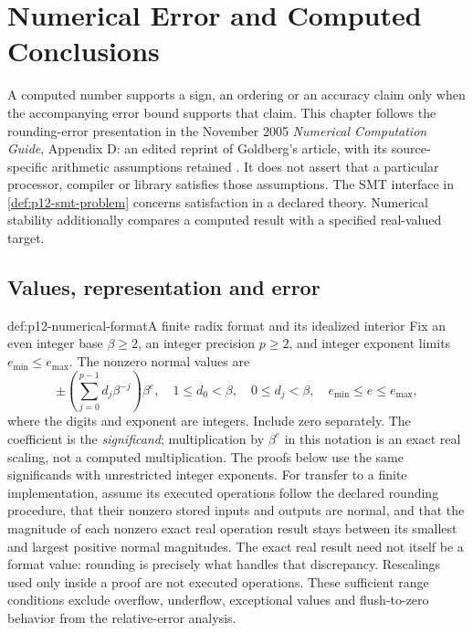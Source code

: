 \chapter{Numerical Error and Computed Conclusions}
\label{sec:p12-numerical-error-and-inference}

A computed number supports a sign, an ordering or an accuracy claim only
when the accompanying error bound supports that claim. This chapter follows
the rounding-error presentation in the November 2005 \emph{Numerical
Computation Guide}, Appendix D: an edited reprint of Goldberg's article,
with its source-specific arithmetic assumptions retained
\cite[Sections D.3, D.6.1 and D.10.1--D.10.2]{GoldbergOracle8193693}.
It does not assert that a particular processor, compiler or library satisfies
those assumptions. The SMT interface in \cref{def:p12-smt-problem} concerns
satisfaction in a declared theory. Numerical stability additionally compares
a computed result with a specified real-valued target.

\section{Values, representation and error}

\begin{hbdefinition}{def:p12-numerical-format}{A finite radix format and its idealized interior}
Fix an even integer base \(\beta\geq2\), an integer precision \(p\geq2\),
and integer exponent limits \(e_{\min}\leq e_{\max}\). The nonzero normal values are
\[
 \pm\left(\sum_{j=0}^{p-1}d_j\beta^{-j}\right)\beta^e,
 \quad 1\leq d_0<\beta,\quad 0\leq d_j<\beta,
 \quad e_{\min}\leq e\leq e_{\max},
\]
where the digits and exponent are integers. Include zero separately.
The coefficient is the \emph{significand}; multiplication by \(\beta^e\)
in this notation is an exact real scaling, not a computed multiplication.
The proofs below use the same significands with unrestricted integer
exponents. For transfer to a finite implementation, assume its executed
operations follow the declared rounding procedure, that their nonzero
stored inputs and outputs are normal, and that the magnitude of each
nonzero exact real operation result stays between its smallest and largest positive normal
magnitudes. The exact real result need not itself be a format value:
rounding is precisely what handles that discrepancy. Rescalings used
only inside a proof are not executed operations. These sufficient range
conditions exclude overflow, underflow, exceptional values and
flush-to-zero behavior from the relative-error analysis.
\end{hbdefinition}

